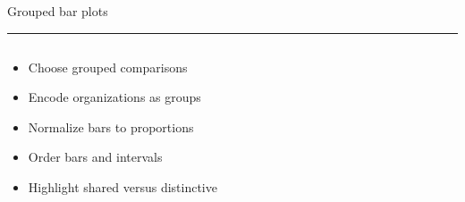 \documentclass[aspectratio=169]{beamer}
\newcommand{\TitleFont}{\rmfamily}
\begin{document}
\begin{frame}[t]{}
  \vspace*{0.5cm}
  {\TitleFont\fontsize{18}{22}\selectfont\color{LUBronze}Grouped bar plots\par}
  \vspace{0.3em}
  {\color{LUBronze}\rule{\linewidth}{0.8pt}}\par
  \vspace{0.2cm}
  \begin{columns}[t]
    \begin{column}[t]{0.45\textwidth}
      \vspace*{0pt}
      \begin{itemize}\setlength\itemsep{0.65em}
        \item Choose grouped comparisons
        \item Encode organizations as groups
        \item Normalize bars to proportions
        \item Order bars and intervals
        \item Highlight shared versus distinctive
      \end{itemize}
    \end{column}
  \end{columns}
\end{frame}
\end{document}
